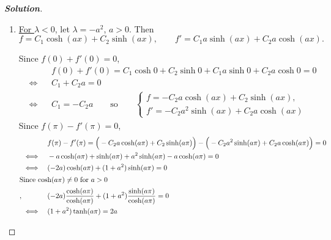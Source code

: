 \documentclass[a4paper,12pt]{article} %
\theoremstyle{plain}
\begin{document}
\begin{proof}[\textbf{Solution}] %
    \begin{enumerate}[label=\alph*.)]
        \item  \underline{For $\lambda < 0$}, let $\lambda = -a^2$, $a>0$. Then \begin{equation*}
        f = C_1 \cosh (a x) + C_2 \sinh (ax), \qquad f' =  C_1 a\sinh (a x) + C_2 a\cosh (ax).
        \end{equation*}
        
        Since $f(0) + f'(0) = 0$,
        \begin{align*}
            &&&f(0) + f'(0) = C_1 \cosh 0 + C_2 \sinh 0 + C_1 a \sinh 0 + C_2 a \cosh 0 = 0\\
            &\iff& &C_1 + C_2 a = 0 \\
            &\iff& &C_1 = -C_2 a  \qquad \text{so}\qquad \begin{cases}
                f=-C_2 a \cosh (ax) + C_2 \sinh(ax),\\
                f'=-C_2 a^2 \sinh(ax) + C_2 a \cosh(ax)
            \end{cases}
        \end{align*}
        Since $f(\pi) -f'(\pi) = 0$,
        \begin{align*}
            && &f(\pi) - f'(\pi) = \Big(-C_2a \cosh (a\pi) + C_2 \sinh (a\pi)\Big) - \Big(-  C_2a^2\sinh (a \pi) + C_2 a\cosh (a\pi)\Big) =0 \\
            &\iff&& -a \cosh(a\pi) + \sinh(a\pi) + a^2 \sinh(a\pi) - a \cosh(a\pi) = 0\\
            &\iff&& (-2a)\cosh(a\pi) + (1+a^2)\sinh(a\pi) = 0\\
            \intertext{Since $\cosh(a\pi) \neq 0$ for $a>0$},
            &&&(-2a)\frac{\cosh(a\pi)}{\cosh(a\pi)} + (1+a^2)\frac{\sinh(a\pi)}{\cosh(a\pi)} = 0 \\
            &\iff&& (1+a^2)\tanh (a\pi) = 2a
        \end{align*}
        

\end{enumerate}
\end{proof}
\end{document}
